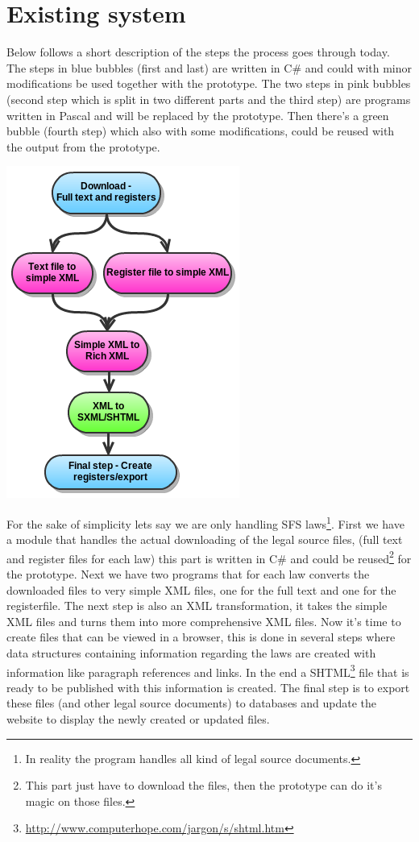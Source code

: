 \section{Existing system}
Below follows a short description of the steps the process goes through today. The steps in blue bubbles (first and last) are written in C\# and could with minor modifications be used together with the prototype. The two steps in pink bubbles (second step which is split in two different parts and the third step) are programs written in Pascal and will be replaced by the prototype. Then there's a green bubble (fourth step) which also with some modifications, could be reused with the output from the prototype.   
\begin{center}
\includegraphics[scale=0.6]{../imgs/oldSystemChart.png}
\end{center}
For the sake of simplicity lets say we are only handling SFS laws\footnote{In reality the program handles all kind of legal source documents.}. First we have a module that handles the actual downloading of the legal source files, (full text and register files for each law) this part is written in C\# and could be reused\footnote{This part just have to download the files, then the prototype can do it's magic on those files.} for the prototype. Next we have two programs that for each law converts the downloaded files to very simple XML files, one for the full text and one for the registerfile. The next step is also an XML transformation, it takes the simple XML files and turns them into more comprehensive XML files. Now it's time to create files that can be viewed in a browser, this is done in several steps where data structures containing information regarding the laws are created with information like paragraph references and links. In the end a SHTML\footnote{\url{http://www.computerhope.com/jargon/s/shtml.htm}} file that is ready to be published with this information is created. The final step is to export these files (and other legal source documents) to databases and update the website to display the newly created or updated files.

